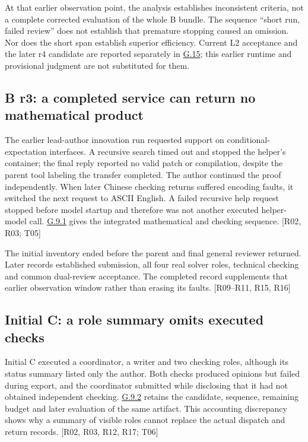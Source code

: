 At that earlier observation point, the analysis establishes inconsistent criteria, not a complete corrected evaluation of the whole B bundle. The sequence “short run, failed review” does not establish that premature stopping caused an omission. Nor does the short span establish superior efficiency. Current L2 acceptance and the later r4 candidate are reported separately in \hyperlink{g15}{G.15}; this earlier runtime and provisional judgment are not substituted for them.

\subsection[B r3: a completed service can return no mathematical product]{\texorpdfstring{\protect\hypertarget{g3}{}B r3: a completed service can return no mathematical product}{B r3: a completed service can return no mathematical product}}
The earlier lead-author innovation run requested support on conditional-expectation interfaces. A recursive search timed out and stopped the helper's container; the final reply reported no valid patch or compilation, despite the parent tool labeling the transfer completed. The author continued the proof independently. When later Chinese checking returns suffered encoding faults, it switched the next request to ASCII English. A failed recursive help request stopped before model startup and therefore was not another executed helper-model call. \hyperlink{g9-1}{G.9.1} gives the integrated mathematical and checking sequence. [R02, R03; T05]

The initial inventory ended before the parent and final general reviewer returned. Later records established submission, all four real solver roles, technical checking and common dual-review acceptance. The completed record supplements that earlier observation window rather than erasing its faults. [R09–R11, R15, R16]

\subsection[Initial C: a role summary omits executed checks]{\texorpdfstring{\protect\hypertarget{g4}{}Initial C: a role summary omits executed checks}{Initial C: a role summary omits executed checks}}
Initial C executed a coordinator, a writer and two checking roles, although its status summary listed only the author. Both checks produced opinions but failed during export, and the coordinator submitted while disclosing that it had not obtained independent checking. \hyperlink{g9-2}{G.9.2} retains the candidate, sequence, remaining budget and later evaluation of the same artifact. This accounting discrepancy shows why a summary of visible roles cannot replace the actual dispatch and return records. [R02, R03, R12, R17; T06]

